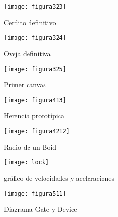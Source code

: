 \begin{figure}
\texttt{[image: figura323]}\\
\centering
\caption{Cerdito definitivo}
\label{fig:figura323}
\end{figure}


\begin{figure}
\texttt{[image: figura324]}\\
\centering
\caption{Oveja definitiva}
\label{fig:figura324}
\end{figure}


\begin{figure}
\texttt{[image: figura325]}
\centering
\caption{Primer canvas}
\label{fig:figura325}
\end{figure}


\begin{figure}
\texttt{[image: figura413]}\\
\centering
\caption{Herencia prototípica}
\label{fig:figura413}
\end{figure}


\begin{figure}
\texttt{[image: figura4212]}\\
\centering
\caption{Radio de un Boid}
\label{fig:figura4212}
\end{figure}

\begin{figure}
\texttt{[image: lock]}\\
\centering
\caption{gráfico de velocidades y aceleraciones}
\label{fig:lock}
\end{figure}
 


\begin{figure}
\texttt{[image: figura511]}\\
\centering
\caption{Diagrama Gate y Device}
\label{fig:figura511}
\end{figure}


